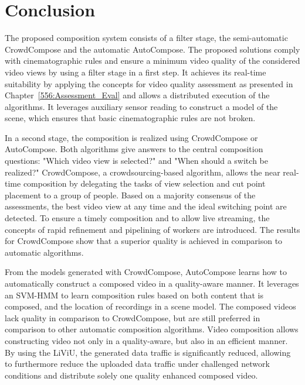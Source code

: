 \section{Conclusion}
\label{sec:699_Conclusion}
The proposed composition system consists of a filter stage, the semi-automatic CrowdCompose and the automatic AutoCompose.
The proposed solutions comply with cinematographic rules and ensure a minimum video quality of the considered video views by using a filter stage in a first step.
It achieves its real-time suitability by applying the concepts for video quality assessment as presented in Chapter~\ref{556:Assessment_Eval} and allows a distributed execution of the algorithms.
It leverages auxiliary sensor reading to construct a model of the scene, which ensures that basic cinematographic rules are not broken. 

In a second stage, the composition is realized using CrowdCompose or AutoCompose. Both algorithms give answers to the central composition questions: "Which video view is selected?" and "When should a switch be realized?" 
CrowdCompose, a crowdsourcing-based algorithm, allows the near real-time composition by delegating the tasks of view selection and cut point placement to a group of people.
Based on a majority consensus of the assessments, the best video view at any time and the ideal switching point are detected.
To ensure a timely composition and to allow live streaming, the concepts of rapid refinement and pipelining of workers are introduced.
The results for CrowdCompose show that a superior quality is achieved in comparison to automatic algorithms.

From the models generated with CrowdCompose, AutoCompose learns how to automatically construct a composed video in a quality-aware manner.
It leverages an \ac{SVM-HMM} to learn composition rules based on both content that is composed, and the location of recordings in a scene model.
The composed videos lack quality in comparison to CrowdCompose, but are still preferred in comparison to other automatic composition algorithms.
Video composition allows constructing video not only in a quality-aware, but also in an efficient manner. 
By using the \ac{LiViU}, the generated data traffic is significantly reduced, allowing to furthermore reduce the uploaded data traffic under challenged network conditions and  distribute solely one quality enhanced composed video.
